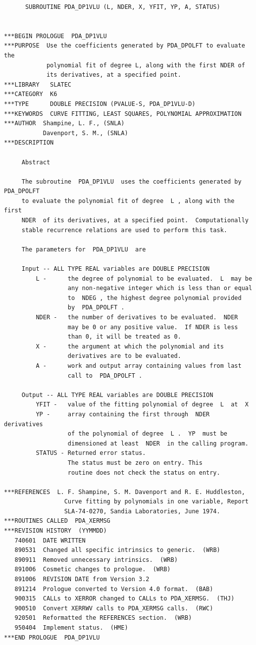 \documentclass[11pt,twoside]{article}
\begin{document}
\begin{verbatim}
      SUBROUTINE PDA_DP1VLU (L, NDER, X, YFIT, YP, A, STATUS)


***BEGIN PROLOGUE  PDA_DP1VLU
***PURPOSE  Use the coefficients generated by PDA_DPOLFT to evaluate the
            polynomial fit of degree L, along with the first NDER of
            its derivatives, at a specified point.
***LIBRARY   SLATEC
***CATEGORY  K6
***TYPE      DOUBLE PRECISION (PVALUE-S, PDA_DP1VLU-D)
***KEYWORDS  CURVE FITTING, LEAST SQUARES, POLYNOMIAL APPROXIMATION
***AUTHOR  Shampine, L. F., (SNLA)
           Davenport, S. M., (SNLA)
***DESCRIPTION

     Abstract

     The subroutine  PDA_DP1VLU  uses the coefficients generated by  PDA_DPOLFT
     to evaluate the polynomial fit of degree  L , along with the first
     NDER  of its derivatives, at a specified point.  Computationally
     stable recurrence relations are used to perform this task.

     The parameters for  PDA_DP1VLU  are

     Input -- ALL TYPE REAL variables are DOUBLE PRECISION
         L -      the degree of polynomial to be evaluated.  L  may be
                  any non-negative integer which is less than or equal
                  to  NDEG , the highest degree polynomial provided
                  by  PDA_DPOLFT .
         NDER -   the number of derivatives to be evaluated.  NDER
                  may be 0 or any positive value.  If NDER is less
                  than 0, it will be treated as 0.
         X -      the argument at which the polynomial and its
                  derivatives are to be evaluated.
         A -      work and output array containing values from last
                  call to  PDA_DPOLFT .

     Output -- ALL TYPE REAL variables are DOUBLE PRECISION
         YFIT -   value of the fitting polynomial of degree  L  at  X
         YP -     array containing the first through  NDER  derivatives
                  of the polynomial of degree  L .  YP  must be
                  dimensioned at least  NDER  in the calling program.
         STATUS - Returned error status.
                  The status must be zero on entry. This
                  routine does not check the status on entry.

***REFERENCES  L. F. Shampine, S. M. Davenport and R. E. Huddleston,
                 Curve fitting by polynomials in one variable, Report
                 SLA-74-0270, Sandia Laboratories, June 1974.
***ROUTINES CALLED  PDA_XERMSG
***REVISION HISTORY  (YYMMDD)
   740601  DATE WRITTEN
   890531  Changed all specific intrinsics to generic.  (WRB)
   890911  Removed unnecessary intrinsics.  (WRB)
   891006  Cosmetic changes to prologue.  (WRB)
   891006  REVISION DATE from Version 3.2
   891214  Prologue converted to Version 4.0 format.  (BAB)
   900315  CALLs to XERROR changed to CALLs to PDA_XERMSG.  (THJ)
   900510  Convert XERRWV calls to PDA_XERMSG calls.  (RWC)
   920501  Reformatted the REFERENCES section.  (WRB)
   950404  Implement status.  (HME)
***END PROLOGUE  PDA_DP1VLU
\end{verbatim}
\end{document}
